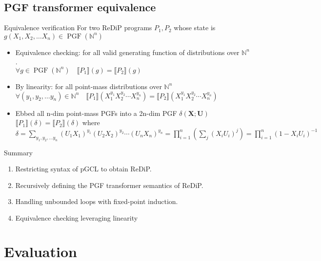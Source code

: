 \documentclass[8pt]{beamer}
\DeclareMathOperator*{\PGF}{PGF}
\renewcommand{\S}[1]{ \llbracket #1 \rrbracket }
\begin{document}
\subsection{PGF transformer equivalence}
\begin{frame}{Equivalence verification}
	For two ReDiP programs \(P_1,P_2\) whose state is \(g(X_1,X_2,\ldots X_n)\in\PGF(\mathbb{N}^n)\)

	\begin{itemize}
		\item Equivalence checking: for all valid generating function of distributions over \(\mathbb{N}^n\).\\
		      \(\displaystyle \forall g \in\PGF(\mathbb{N}^n) \quad \S{P_1}(g) = \S{P_2}(g) \)
		\item By linearity: for all point-mass distributions over \(\mathbb{N}^n\)\\
		      \(\displaystyle \forall (y_1,y_2,\ldots y_n) \in \mathbb{N}^n \quad \S{P_1}(X_1^{y_1}X_2^{y_2}\cdots X_n^{y_n}) = \S{P_2}(X_1^{y_1}X_2^{y_2}\cdots X_n^{y_n}) \)
		\item Ebbed all n-dim point-mass PGFs into a 2n-dim PGF \(\delta(\mathbf{X};\mathbf{U})\)\\
		      \(\displaystyle \S{P_1}(\delta) = \S{P_2}(\delta) \)
		      where
		      \(
		      \displaystyle
		      \delta
		      = \sum_{y_1,y_2,\ldots y_n} (U_1X_1)^{y_1}(U_2X_2)^{y_2}\cdots (U_nX_n)^{y_n}
		      = \prod_{i=1}^n \left( \sum_j (X_iU_i)^j \right)
		      = \prod_{i=1}^n (1-X_iU_i)^{-1}
		      \)
	\end{itemize}
\end{frame}
\begin{frame}{Summary}
	\begin{enumerate}
		\item Restricting syntax of pGCL to obtain ReDiP.
		\item Recursively defining the PGF transformer semantics of ReDiP.
		\item Handling unbounded loops with fixed-point induction.
		\item Equivalence checking leveraging linearity
	\end{enumerate}
\end{frame}

\section{Evaluation}
\end{document}
